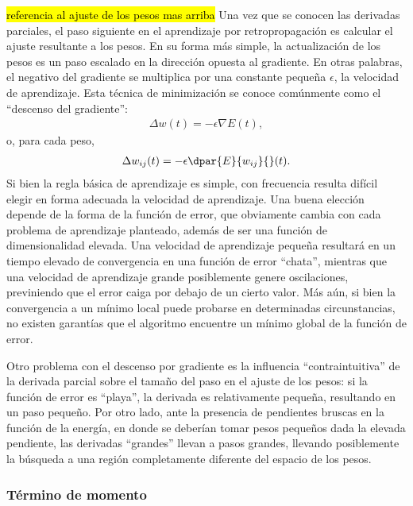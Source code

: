 \hl{referencia al ajuste de los pesos mas arriba}
Una vez que se conocen las derivadas parciales, el paso siguiente en
el aprendizaje por retropropagación es calcular el ajuste resultante a
los pesos. En su forma más simple, la actualización de los pesos es un
paso escalado en la dirección opuesta al gradiente.  En otras
palabras, el negativo del gradiente se multiplica por una constante
pequeña $\epsilon$, la velocidad de aprendizaje. Esta técnica de
minimización se conoce comúnmente como el ``descenso del gradiente'':
%
\begin{align}\label{mlp6}
  \Delta w(t) = - \epsilon \nabla E(t),
\end{align}
%
o, para cada peso,
%
\begin{align}\label{mlp6}
  \Delta w_{ij}(t) = - \epsilon \dpar{E}{w_{ij}}{}(t).
\end{align}
%
Si bien la regla básica de aprendizaje es simple, con frecuencia
resulta difícil elegir en forma adecuada la velocidad de
aprendizaje. Una buena elección depende de la forma de la función de
error, que obviamente cambia con cada problema de aprendizaje
planteado, además de ser una función de dimensionalidad elevada.  Una
velocidad de aprendizaje pequeña resultará en un tiempo elevado de
convergencia en una función de error ``chata'', mientras que una velocidad
de aprendizaje grande posiblemente genere oscilaciones, previniendo
que el error caiga por debajo de un cierto valor.  Más aún, si bien la
convergencia a un mínimo local puede probarse en determinadas
circunstancias, no existen garantías que el algoritmo encuentre un
mínimo global de la función de error.

Otro problema con el descenso por gradiente es la influencia
``contraintuitiva'' de la derivada parcial sobre el tamaño del paso en
el ajuste de los pesos: si la función de error es ``playa'', la
derivada es relativamente pequeña, resultando en un paso pequeño.  Por
otro lado, ante la presencia de pendientes bruscas en la función de
la energía, en donde se deberían tomar pesos pequeños dada la
elevada pendiente, las derivadas ``grandes'' llevan a pasos grandes,
llevando posiblemente la búsqueda a una región completamente diferente
del espacio de los pesos.

\subsubsection{Término de momento}

